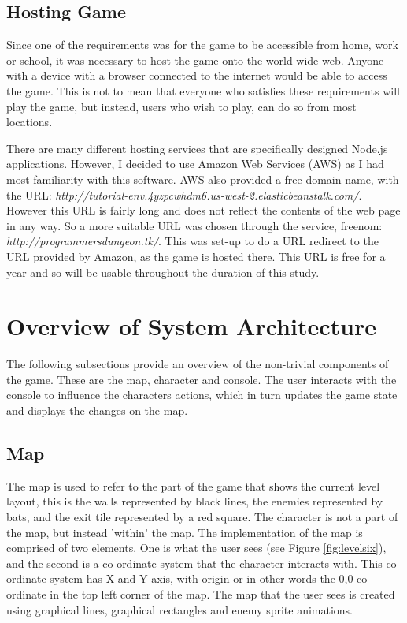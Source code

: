 \documentclass[a4paper,11.5pt]{report}
\numberwithin{figure}{section}
\numberwithin{table}{section}
\numberwithin{equation}{section}
\numberwithin{equation}{section}
\begin{document}
\subsection{Hosting Game}

Since one of the requirements was for the game to be accessible from home, work or school, it was necessary to host the game onto the world wide web. Anyone with a device with a browser connected to the internet would be able to access the game. This is not to mean that everyone who satisfies these requirements will play the game, but instead, users who wish to play, can do so from most locations.

There are many different hosting services that are specifically designed Node.js applications. However, I decided to use Amazon Web Services (AWS) as I had most familiarity with this software. AWS also provided a free domain name, with the URL: \textit{http://tutorial-env.4yzpcwhdm6.us-west-2.elasticbeanstalk.com/}. However this URL is fairly long and does not reflect the contents of the web page in any way. So a more suitable URL was chosen through the service, freenom: \textit{http://programmersdungeon.tk/}. This was set-up to do a URL redirect to the URL provided by Amazon, as the game is hosted there. This URL is free for a year and so will be usable throughout the duration of this study. 


\section{Overview of System Architecture}

The following subsections provide an overview of the non-trivial components of the game. These are the map, character and console. The user interacts with the console to influence the characters actions, which in turn updates the game state and displays the changes on the map.

\subsection{Map}

The map is used to refer to the part of the game that shows the current level layout, this is the walls represented by black lines, the enemies represented by bats, and the exit tile represented by a red square. The character is not a part of the map, but instead 'within' the map. The implementation of the map is comprised of two elements. One is what the user sees (see Figure \ref{fig:levelsix}), and the second is a co-ordinate system that the character interacts with. This co-ordinate system has X and Y axis, with origin or in other words the 0,0 co-ordinate in the top left corner of the map. The map that the user sees is created using graphical lines, graphical rectangles and enemy sprite animations.
\end{document}
